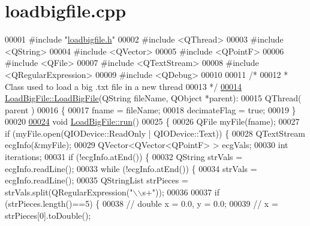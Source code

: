 \hypertarget{loadbigfile_8cpp_source}{}\section{loadbigfile.\+cpp}
\label{loadbigfile_8cpp_source}

\begin{DoxyCode}
00001 \textcolor{preprocessor}{#include "\hyperlink{loadbigfile_8h}{loadbigfile.h}"}
00002 \textcolor{preprocessor}{#include <QThread>}
00003 \textcolor{preprocessor}{#include <QString>}
00004 \textcolor{preprocessor}{#include <QVector>}
00005 \textcolor{preprocessor}{#include <QPointF>}
00006 \textcolor{preprocessor}{#include <QFile>}
00007 \textcolor{preprocessor}{#include <QTextStream>}
00008 \textcolor{preprocessor}{#include <QRegularExpression>}
00009 \textcolor{preprocessor}{#include <QDebug>}
00010 
00011 \textcolor{comment}{/*}
00012 \textcolor{comment}{ * Class used to load a big .txt file in a new thread}
00013 \textcolor{comment}{ */}
\hypertarget{loadbigfile_8cpp_source.tex_l00014}{}\hyperlink{classLoadBigFile_ad09a2464295530b5a7f202d7059e7e8a}{00014} \hyperlink{classLoadBigFile_ad09a2464295530b5a7f202d7059e7e8a}{LoadBigFile::LoadBigFile}(QString fileName, QObject *parent):
00015 QThread( parent )
00016 \{
00017     fname = fileName;
00018     decimateFlag = \textcolor{keyword}{true};
00019 \}
00020 
\hypertarget{loadbigfile_8cpp_source.tex_l00024}{}\hyperlink{classLoadBigFile_a8a1ceb823a23faa69485c864c35cd60f}{00024} \textcolor{keywordtype}{void} \hyperlink{classLoadBigFile_a8a1ceb823a23faa69485c864c35cd60f}{LoadBigFile::run}()
00025 \{
00026     QFile myFile(fname);
00027     \textcolor{keywordflow}{if} (myFile.open(QIODevice::ReadOnly | QIODevice::Text)) \{
00028         QTextStream ecgInfo(&myFile);
00029         QVector<QVector<QPointF> > ecgVals;
00030         \textcolor{keywordtype}{int} iterations;
00031         \textcolor{keywordflow}{if} (!ecgInfo.atEnd()) \{
00032             QString strVals = ecgInfo.readLine();
00033             \textcolor{keywordflow}{while} (!ecgInfo.atEnd()) \{
00034                 strVals = ecgInfo.readLine();
00035                 QStringList strPieces = strVals.split(QRegularExpression(\textcolor{stringliteral}{"\(\backslash\)\(\backslash\)s+"}));
00036 
00037                 \textcolor{keywordflow}{if} (strPieces.length()==5) \{
00038                     \textcolor{comment}{//                double x = 0.0, y = 0.0;}
00039                     \textcolor{comment}{//                x = strPieces[0].toDouble();}

\end{DoxyCode}

